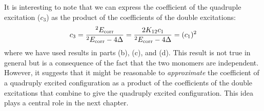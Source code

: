 \documentclass[a4paper]{book}
\newcommand{\corr}{{\rm corr}}
\begin{document}
\begin{exercise}
	It is interesting to note that we can express the coefficient of the quadruple excitation ($c_3$) as the product of the coefficients of the double excitations:
	\[
		c_3 = \frac{ {}^{2} E_\corr }{ {}^{2} E_\corr - 4\Delta } = \frac{ 2 K_{12} c_1 }{ {}^{2} E_\corr - 4\Delta } = (c_1)^2
	\]
	where we have used results in parts (b), (c), and (d). This result is not true in general but is a consequence of the fact that the two monomers are independent. However, it suggests that it might be reasonable to {\it approximate} the coefficient of a quadruply excited configuration as a product of the coefficients of the double excitations that combine to give the quadruply excited configuration. This idea plays a central role in the next chapter.
	\end{exercise}
	
	\begin{solution}
	
	\begin{itemize}
		

\end{itemize}
\end{solution}
\end{document}
